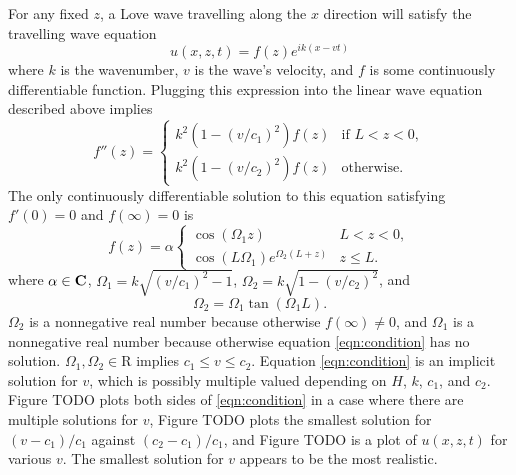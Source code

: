 \documentclass[11pt,letter,subeqn,fleqn]{article}
\numberwithin{equation}{section}
\numberwithin{table}{section}
\numberwithin{figure}{section}
\def\vec#1{{\boldsymbol{\rm #1}}} %
\def\vec#1{{\boldsymbol{\rm #1}}} %
\newcommand{\R}{\mathrm{R}}
\newcommand{\C}{\vec{C}}
\begin{document}
For any fixed $z$, a Love wave travelling along the $x$ direction will satisfy the travelling
wave equation
\[
	u(x,z,t) = f(z)e^{ik(x-vt)}
\]
where $k$ is the wavenumber, $v$ is the wave's velocity, and $f$ is some continuously differentiable
function. Plugging this expression into the linear wave equation described above implies
\[
	f''(z) = \begin{cases}
		k^2(1-(v/c_1)^2)f(z) & \text{if } L < z < 0, \\
		k^2(1-(v/c_2)^2)f(z) & \text{otherwise.}
	\end{cases}
\]
The only continuously differentiable solution to this equation satisfying $f'(0) = 0$ and $f(\infty)=0$ is
\begin{equation}
	f(z) = \alpha
	\begin{cases}
		\cos(\Omega_1z)                  & L < z < 0,    \\
		\cos(L\Omega_1)e^{\Omega_2(L+z)} & z \leq L.
	\end{cases}
\end{equation}
where $\alpha\in\C$, $\Omega_1 = k\sqrt{(v/c_1)^2-1}$, $\Omega_2 = k\sqrt{1-(v/c_2)^2}$, and 
\begin{equation}
	\label{eqn:condition}
	\Omega_2 = \Omega_1\tan(\Omega_1L).
\end{equation}
$\Omega_2$ is a nonnegative real number because otherwise $f(\infty)\neq0$, and $\Omega_1$ is a nonnegative real
number because otherwise equation \eqref{eqn:condition} has no solution. $\Omega_1,\Omega_2\in\R$ implies
$c_1 \leq v \leq c_2$. Equation \eqref{eqn:condition} is an implicit solution for $v$, which is possibly multiple
valued depending on $H$, $k$, $c_1$, and $c_2$. Figure TODO plots both sides of \eqref{eqn:condition} in a case where
there are multiple solutions for $v$, Figure TODO plots the smallest solution for $(v-c_1)/c_1$ against
$(c_2-c_1)/c_1$, and Figure TODO is a plot of $u(x,z,t)$ for various $v$. The smallest solution for $v$
appears to be the most realistic.
\end{document}
